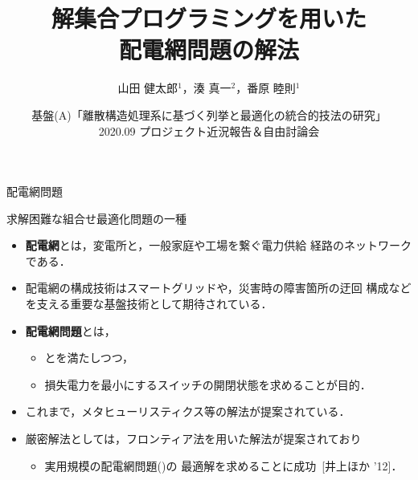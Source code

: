 \documentclass[dvipdfmx,11pt]{beamer}
\title{解集合プログラミングを用いた\\配電網問題の解法}
\author[山田 健太郎，湊 真一，番原 睦則]{山田 健太郎$^1$，湊 真一$^2$，番原 睦則$^1$}
\date{\small 基盤(A)「離散構造処理系に基づく列挙と最適化の統合的技法の研究」\\
2020.09 プロジェクト近況報告＆自由討論会}
\institute{1.名古屋大学 大学院情報学研究科 \\ 2.京都大学 大学院情報学研究科}
\begin{document}
\begin{frame}{}
  \titlepage
\end{frame}

\begin{frame}{配電網問題}
  \begin{alertblock}{}\centering
    求解困難な組合せ最適化問題の一種
  \end{alertblock}
  \vfill
  \begin{itemize}
  \item \alert{\bf 配電網}とは，変電所と，一般家庭や工場を繋ぐ電力供給
    経路のネットワークである．
  \item  配電網の構成技術はスマートグリッドや，災害時の障害箇所の迂回
    構成などを支える重要な基盤技術として期待されている．
  \item \alert{\bf 配電網問題}とは，
    \begin{itemize}
    \item {}とを満たしつつ，
    \item 損失電力を最小にするスイッチの開閉状態を求めることが目的．
    \end{itemize}
  \item これまで，メタヒューリスティクス等の解法が提案されている．
  \item 厳密解法としては，フロンティア法を用いた解法が提案されており
    \begin{itemize}
    \item 実用規模の配電網問題()の
      最適解を求めることに成功~[井上ほか '12]．
    \end{itemize}
  \end{itemize}
\end{frame}
\end{document}

